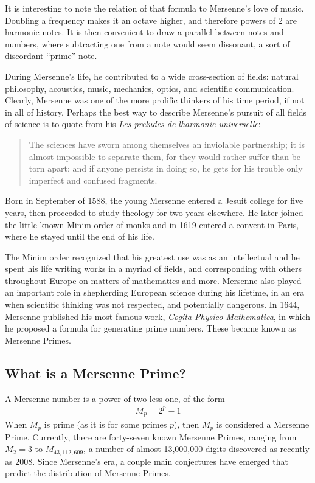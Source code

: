It is interesting to note the relation of that formula to Mersenne's love of music.  Doubling a frequency makes it an octave higher, and therefore powers of 2 are harmonic notes.  It is then convenient to draw a parallel between notes and numbers, where subtracting one from  a note would seem dissonant, a sort of discordant ``prime'' note. 

During Mersenne's life, he contributed to a wide cross-section of fields: natural philosophy, acoustics, music, mechanics, optics, and scientific communication\cite{scibio}. Clearly, Mersenne was one of the more prolific thinkers of his time period, if not in all of history. Perhaps the best way to describe Mersenne's pursuit of all fields of science is to quote from his \emph{Les preludes de lharmonie universelle}:

\begin{quote}
The sciences have sworn among themselves an inviolable partnership; it is almost impossible to separate them, for they would rather suffer than be torn apart; and if anyone persists in doing so, he gets for his trouble only imperfect and confused fragments. \cite{lfrench}
\end{quote}

Born in September of 1588, the young Mersenne entered a Jesuit college for five years, then proceeded to study theology for two years elsewhere. He later joined the little known Minim order of monks and in 1619 entered a convent in Paris, where he stayed until the end of his life.

The Minim order recognized that his greatest use was as an intellectual and he spent his life writing works in a myriad of fields, and corresponding with others throughout Europe on matters of mathematics and more. Mersenne also played an important role in shepherding European science during his lifetime, in an era when scientific thinking was not respected, and potentially dangerous. In 1644, Mersenne published his most famous work, \emph{Cogita Physico-Mathematica}, in which he proposed a formula for generating prime numbers. These became known as Mersenne Primes.

\subsection{What is a Mersenne Prime?}

A Mersenne number is a power of two less one, of the form
\begin{align}
M_p = 2^p - 1
\label{eqn:mp}
\end{align}
When $M_p$ is prime (as it is for some primes $p$), then $M_p$ is considered a Mersenne Prime. Currently,
there are forty-seven known Mersenne Primes, ranging from $M_2 = 3$ to $M_{43,112,609}$, a number of almost
13,000,000 digits discovered as recently as 2008. Since Mersenne's era, a couple main conjectures have emerged
that predict the distribution of Mersenne Primes.

